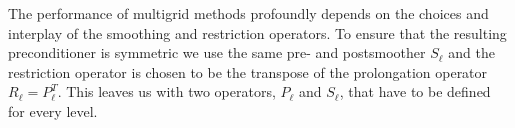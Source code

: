 


The performance of multigrid methods profoundly depends on the choices and
interplay of the smoothing and restriction operators. To ensure that the
resulting preconditioner is symmetric we use the same pre- and postsmoother
$S_\ell$ and the restriction operator is chosen to be the transpose of the
prolongation operator $R_\ell = P_\ell^T$. This leaves us with two operators,
$P_\ell$ and $S_\ell$, that have to be defined for every level.


